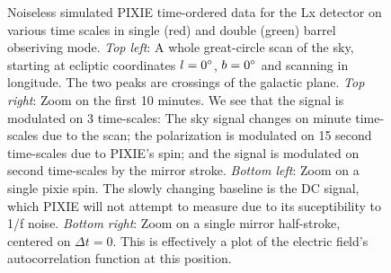 \documentclass{article}
\begin{document}
\begin{figure}
	\caption{Noiseless simulated PIXIE time-ordered data for the Lx
	detector on various time scales in single (red) and double (green)
	barrel obseriving mode. \emph{Top left}: A whole great-circle
	scan of the sky, starting at ecliptic coordinates $l=0\degree$,
	$b=0\degree$ and scanning in longitude. The two peaks are crossings
	of the galactic plane. \emph{Top right}: Zoom on the first 10 minutes.
	We see that the signal is modulated on 3 time-scales: The sky signal
	changes on minute time-scales due to the scan; the polarization is
	modulated on 15 second time-scales due to PIXIE's spin; and the
	signal is modulated on second time-scales by the mirror stroke.
	\emph{Bottom left}: Zoom on a single pixie spin. The slowly
	changing baseline is the DC signal, which PIXIE will not attempt
	to measure due to its suceptibility to 1/f noise. \emph{Bottom
	right}: Zoom on a single mirror half-stroke, centered on
	$\Delta t=0$. This is effectively a plot of the electric field's
	autocorrelation function at this position.}
	\label{fig:tod}
\end{figure}
\end{document}

